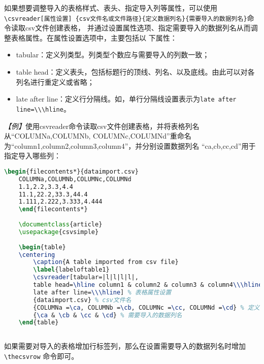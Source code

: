 如果想要调整导入的表格样式、表头、指定导入列等属性，可以使用\texttt{\textbackslash{}csvreader[属性设置]
\{csv文件名或文件路径\}\{定义数据列名\}\{需要导入的数据列名\}}命令读取csv文件创建表格，
并通过设置属性选项、指定需要导入的数据列名从而调整表格属性。在属性设置选项中，主要包括以
下属性：
\begin{itemize}
    \item tabular：定义列类型。列类型个数应与需要导入的列数一致；
    \item table head：定义表头，包括标题行的顶线、列名、以及底线。由此可以对各列名进行重定义或省略；
    \item late after line：定义行分隔线。如，单行分隔线设置表示为\texttt{late after line=\textbackslash{}\textbackslash{}\textbackslash{}hline}。
\end{itemize}

\emph{【例】}使用csvreader命令读取csv文件创建表格，并将表格列名从“COLUMNa,COLUMNb,
COLUMNc,COLUMNd”重命名为“column1,column2,column3,column4”，并分别设置数据列名
“ca,cb,cc,cd”用于指定导入哪些列：
\begin{lstlisting}[language=TeX]
    \begin{filecontents*}{dataimport.csv}
    COLUMNa,COLUMNb,COLUMNc,COLUMNd
    1.1,2.2,3.3,4.4
    11.1,22.2,33.3,44.4
    1.111,2.222,3.333,4.444
    \end{filecontents*}
    
    \documentclass{article}
    \usepackage{csvsimple}
    
    \begin{table}
    \centering
        \caption{A table imported from csv file}
        \label{labeloftable1}
        \csvreader[tabular=|l|l|l|l|,
        table head=\hline column1 & column2 & column3 & column4\\\hline,
        late after line=\\\hline] % 表格属性设置
        {dataimport.csv} % csv文件名
        {COLUMNa =\ca, COLUMNb =\cb, COLUMNc =\cc, COLUMNd =\cd} % 定义数据列名
        {\ca & \cb & \cc & \cd} % 需要导入的数据列名
    \end{table}
    
\end{lstlisting}

如果需要对导入的表格增加行标签列，那么在设置需要导入的数据列名时增加\texttt{\textbackslash{}thecsvrow}
命令即可。

